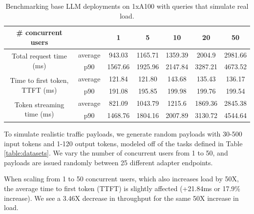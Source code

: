\begin{table}[ht]
\centering  
\footnotesize %

\begin{tabular}{ccccccc}
\# concurrent users                             &         & 1       & 5       & 10      & 20      & 50      \\
\midrule
\multirow{2}{*}{Total request time (ms)}        & average & 943.03  & 1165.71 & 1359.39 & 2004.9  & 2981.66 \\
                                                & p90     & 1567.66 & 1925.96 & 2147.84 & 3287.21 & 4673.52 \\
\multirow{2}{*}{Time to first token, TTFT (ms)} & average & 121.84  & 121.80  & 143.68  & 135.43  & 136.17  \\
                                                & p90     & 191.08  & 195.85  & 199.98  & 199.76  & 199.54  \\
\multirow{2}{*}{Token streaming time (ms)}      & average & 821.09  & 1043.79 & 1215.6  & 1869.36 & 2845.38 \\
                                                & p90     & 1468.76 & 1804.16 & 2007.89 & 3130.72 & 4544.64
\end{tabular}
\vspace{5mm}
\caption{Benchmarking base LLM deployments on 1xA100 with queries that simulate real load.}
\end{table}

To simulate realistic traffic payloads, we generate random payloads with 30-500 input tokens and 1-120 output tokens, modeled off of the tasks defined in Table \ref{table:datasets}. We vary the number of concurrent users from 1 to 50, and payloads are issued randomly between 25 different adapter endpoints. 

When scaling from 1 to 50 concurrent users, which also increases load by 50X, the average time to first token (TTFT) is slightly affected (+21.84ms or 17.9\% increase). We see a 3.46X decrease in throughput for the same 50X increase in load.

